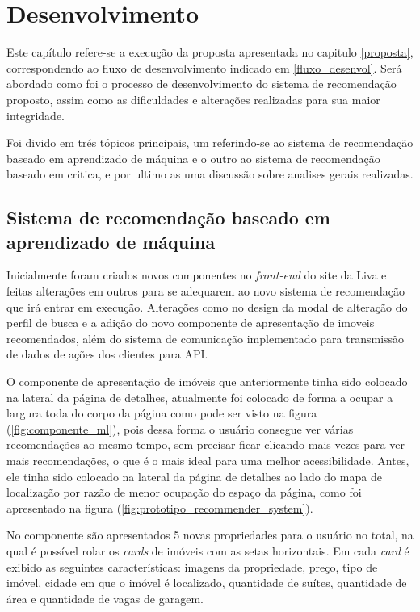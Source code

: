 \chapter{Desenvolvimento}
\label{desenvolvimento}

Este capítulo refere-se a execução da proposta apresentada no capitulo \ref{proposta}, correspondendo ao fluxo de desenvolvimento indicado em \ref{fluxo_desenvol}. Será abordado como foi o processo de desenvolvimento do sistema de recomendação proposto, assim como as dificuldades e alterações realizadas para sua maior integridade.

Foi divido em trés tópicos principais, um referindo-se ao sistema de recomendação baseado em aprendizado de máquina e o outro ao sistema de recomendação baseado em critica, e por ultimo as uma discussão sobre analises gerais realizadas.

\section{Sistema de recomendação baseado em aprendizado de máquina}

Inicialmente foram criados novos componentes no \textit{front-end} do site da Liva e feitas alterações em outros para se adequarem ao novo sistema de recomendação que irá entrar em execução. Alterações como no design da modal de alteração do perfil de busca e a adição do novo componente de apresentação de imoveis recomendados, além do sistema de comunicação implementado para transmissão de dados de ações dos clientes para API.

O componente de apresentação de imóveis que anteriormente tinha sido colocado na lateral da página de detalhes, atualmente foi colocado de forma a ocupar a largura toda do corpo da página como pode ser visto na figura (\ref{fig:componente_ml}), pois dessa forma o usuário consegue ver várias recomendações ao mesmo tempo, sem precisar ficar clicando mais vezes para ver mais recomendações, o que é o mais ideal para uma melhor acessibilidade. Antes, ele tinha sido colocado na lateral da página de detalhes ao lado do mapa de localização por razão de menor ocupação do espaço da página, como foi apresentado na figura (\ref{fig:prototipo_recommender_system}).

No componente são apresentados 5 novas propriedades para o usuário no total, na qual é possível rolar os \textit{cards} de imóveis com as setas horizontais. Em cada \textit{card} é exibido as seguintes características: imagens da propriedade, preço, tipo de imóvel, cidade em que o imóvel é localizado, quantidade de suítes, quantidade de área e quantidade de vagas de garagem.

